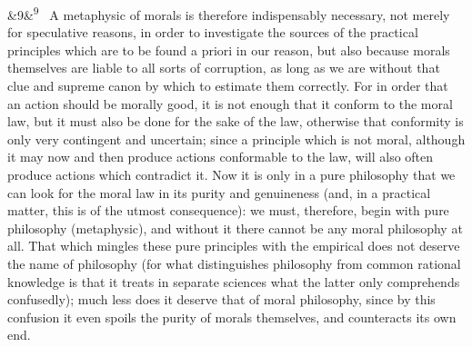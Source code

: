 \documentclass[12pt]{article}
\newcommand{\para}[1][]{\par\noindent\ifx&#1&\else\textsuperscript{\footnotesize #1}~\fi}
\begin{document}
\para[9] A metaphysic of morals is therefore indispensably necessary, not merely for speculative reasons, in order to investigate the sources of the practical principles which are to be found a priori in our reason, but also because morals themselves are liable to all sorts of corruption, as long as we are without that clue and supreme canon by which to estimate them correctly. For in order that an action should be morally good, it is not enough that it conform to the moral law, but it must also be done for the sake of the law, otherwise that conformity is only very contingent and uncertain; since a principle which is not moral, although it may now and then produce actions conformable to the law, will also often produce actions which contradict it. Now it is only in a pure philosophy that we can look for the moral law in its purity and genuineness (and, in a practical matter, this is of the utmost consequence): we must, therefore, begin with pure philosophy (metaphysic), and without it there cannot be any moral philosophy at all. That which mingles these pure principles with the empirical does not deserve the name of philosophy (for what distinguishes philosophy from common rational knowledge is that it treats in separate sciences what the latter only comprehends confusedly); much less does it deserve that of moral philosophy, since by this confusion it even spoils the purity of morals themselves, and counteracts its own end.
\end{document}
